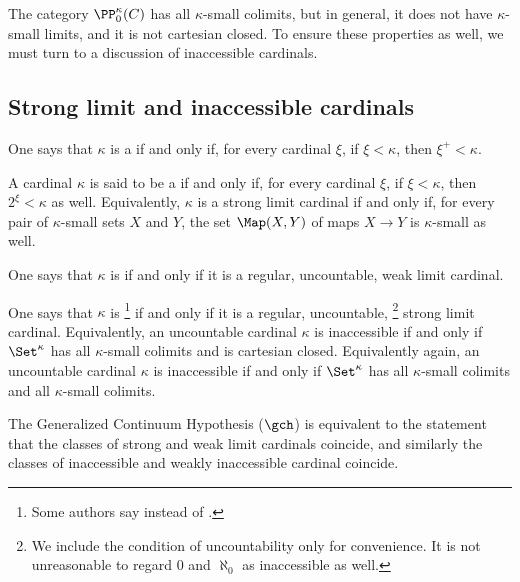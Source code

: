 \begin{nul}
	The category $ \PP^{\kappa}_0(C) $
	has all $ \kappa $-small colimits, but
	in general, it does not have $ \kappa $-small limits, and
	it is not cartesian closed.
	To ensure these properties as well,
	we must turn to a discussion of inaccessible cardinals.
\end{nul}

\subsection{Strong limit and inaccessible cardinals}%
\label{sub:strong_limit_and_inaccessible_cardinals}

\begin{definition}
	One says that $ \kappa $ is a  if and only if,
	for every cardinal $ \xi $,
	if $ \xi < \kappa $, then $ \xi^+ < \kappa $.

	A cardinal $\kappa$ is said to be a  if and only if,
	for every cardinal $ \xi $,
	if $ \xi < \kappa $, then $ 2^{\xi} < \kappa $ as well.
	Equivalently, $ \kappa $ is a strong limit cardinal if and only if,
	for every pair of $ \kappa $-small sets $ X $ and $ Y $,
	the set $ \Map(X, Y) $ of maps $ X \to Y $ is $ \kappa $-small as well. 

	One says that $\kappa$ is  if and only if
	it is a regular, uncountable, weak limit cardinal.

	One says that $\kappa$ is %
	\footnote{Some authors say 
	instead of .}
	if and only if it is a regular, uncountable,%
	\footnote{We include the condition of uncountability only for convenience.
		It is not unreasonable to regard $ 0 $ and $ \aleph_0 $
		as inaccessible as well.}
	strong limit cardinal.
	Equivalently, an uncountable cardinal $ \kappa $ is inaccessible if and only if
	$ \Set^{\kappa} $ has all $ \kappa $-small colimits and is cartesian closed.
	Equivalently again, an uncountable cardinal $ \kappa $ is inaccessible if and only if 
	$ \Set^{\kappa} $ has all $ \kappa $-small colimits and all $ \kappa $-small colimits.
\end{definition}

The Generalized Continuum Hypothesis ($ \gch $) is equivalent to the statement that
the classes of strong and weak limit cardinals coincide,
and similarly the classes of inaccessible and weakly inaccessible cardinal coincide.

